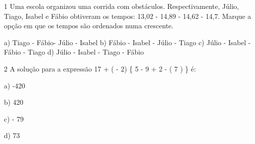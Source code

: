 
\num{1} Uma escola organizou uma corrida com obstáculos. Respectivamente,
Júlio, Tiago, Isabel e Fábio obtiveram os tempos:
13,02  - 14,89  - 14,62  - 14,7. Marque a opção em que os
tempos são ordenados numa crescente.

a) Tiago - Fábio- Júlio - Isabel
b) Fábio - Isabel - Júlio - Tiago
c) Júlio - Isabel - Fábio - Tiago
d) Júlio - Isabel - Tiago - Fábio



\num{2} A solução para a expressão
17 + ( - 2) \times \left\{ 5 - 9 + 2 \times \left{}  - \left( 7  \right) \right\rbrack \right\}
é:

a) -420

b) 420

c) - 79

d) 73



